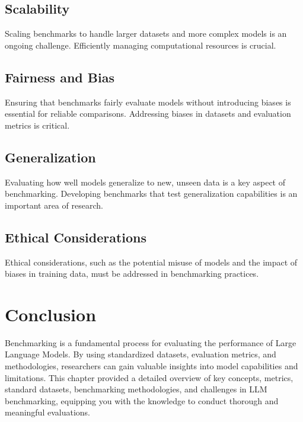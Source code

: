\subsection{Scalability}
Scaling benchmarks to handle larger datasets and more complex models is an ongoing challenge. Efficiently managing computational resources is crucial.

\subsection{Fairness and Bias}
Ensuring that benchmarks fairly evaluate models without introducing biases is essential for reliable comparisons. Addressing biases in datasets and evaluation metrics is critical.

\subsection{Generalization}
Evaluating how well models generalize to new, unseen data is a key aspect of benchmarking. Developing benchmarks that test generalization capabilities is an important area of research.

\subsection{Ethical Considerations}
Ethical considerations, such as the potential misuse of models and the impact of biases in training data, must be addressed in benchmarking practices.

\section{Conclusion}
Benchmarking is a fundamental process for evaluating the performance of Large Language Models. By using standardized datasets, evaluation metrics, and methodologies, researchers can gain valuable insights into model capabilities and limitations. This chapter provided a detailed overview of key concepts, metrics, standard datasets, benchmarking methodologies, and challenges in LLM benchmarking, equipping you with the knowledge to conduct thorough and meaningful evaluations.


% 
% 